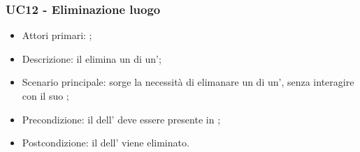 \documentclass[../analisi-dei-requisiti]{subfiles}
\begin{document}
\subsubsection{UC12 - Eliminazione luogo}
\label{subsub:UC12}

\begin{itemize}
\item Attori primari: ;
\item Descrizione: il  elimina un  di un';
\item Scenario principale: sorge la necessità di elimanare un  di un', senza interagire con il suo ; 
\item Precondizione: il  dell' deve essere presente in ;
\item Postcondizione: il  dell' viene eliminato.

\end{itemize}


\end{document}
